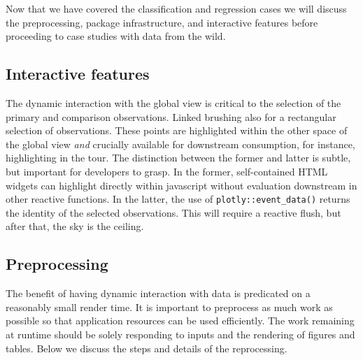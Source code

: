 \documentclass[
]{article}
\begin{document}
Now that we have covered the classification and regression cases we will discuss the preprocessing, package infrastructure, and interactive features before proceeding to case studies with data from the wild.

\hypertarget{interactive-features}{%
\subsection{Interactive features}\label{interactive-features}}

The dynamic interaction with the global view is critical to the selection of the primary and comparison observations. Linked brushing also for a rectangular selection of observations. These points are highlighted within the other space of the global view \emph{and} crucially available for downstream consumption, for instance, highlighting in the tour. The distinction between the former and latter is subtle, but important for developers to grasp. In the former, self-contained HTML widgets can highlight directly within javascript without evaluation downstream in other reactive functions. In the latter, the use of \texttt{plotly::event\_data()} returns the identity of the selected observations. This will require a reactive flush, but after that, the sky is the ceiling.

\hypertarget{preprocessing}{%
\subsection{Preprocessing}\label{preprocessing}}

The benefit of having dynamic interaction with data is predicated on a reasonably small render time. It is important to preprocess as much work as possible so that application resources can be used efficiently. The work remaining at runtime should be solely responding to inputs and the rendering of figures and tables. Below we discuss the steps and details of the reprocessing.
\end{document}
